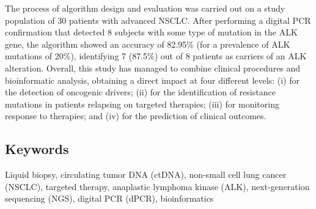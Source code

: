 The process of algorithm design and evaluation was carried out on a study population of 30 patients with advanced NSCLC. After performing a digital PCR confirmation that detected 8 subjects with some type of mutation in the ALK gene, the algorithm showed an accuracy of 82.95\% (for a prevalence of ALK mutations of 20\%), identifying 7 (87.5\%) out of 8 patients as carriers of an ALK alteration. 
Overall, this study has managed to combine clinical procedures and bioinformatic analysis, obtaining a direct impact at four different levels: (i) for the detection of oncogenic drivers; (ii) for the identification of resistance mutations in patients relapsing on targeted therapies; (iii) for monitoring response to therapies; and (iv) for the prediction of clinical outcomes.

\subsection*{Keywords}

Liquid biopsy, circulating tumor DNA (ctDNA), non-small cell lung cancer (NSCLC), targeted therapy, anaplastic lymphoma kinase (ALK), next-generation sequencing (NGS), digital PCR (dPCR), bioinformatics